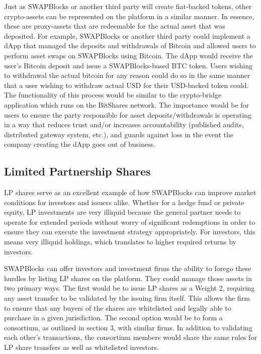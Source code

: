 \documentclass[12pt]{article}
\begin{document}
Just as SWAPBlocks or another third party will create fiat-backed tokens, other crypto-assets can be 
represented on the platform in a similar manner. In essence, these are proxy-assets that are redeemable 
for the actual asset that was deposited. For example, SWAPBlocks or another third party could implement a 
dApp that managed the deposits and withdrawals of Bitcoin and allowed users to perform asset swaps on SWAPBlocks 
using Bitcoin. The dApp would receive the user’s Bitcoin deposit and issue a SWAPBlocks-based BTC token. Users 
wishing to withdrawal the actual bitcoin for any reason could do so in the same manner that a user wishing to 
withdraw actual USD for their USD-backed token could. The functionality of this process would be similar to the 
crypto-bridge application which runs on the BitShares network. The importance would be for users to ensure the 
party responsible for asset deposits/withdrawals is operating in a way that reduces trust and/or increases 
accountability (published audits, distributed gateway system, etc.), and guards against loss in the event the 
company creating the dApp goes out of business.

\subsection{Limited Partnership Shares}

LP shares serve as an excellent example of how SWAPBlocks can improve market conditions for investors and 
issuers alike. Whether for a hedge fund or private equity, LP investments are very illiquid because the 
general partner needs to operate for extended periods without worry of significant redemptions in order to 
ensure they can execute the investment strategy appropriately. For investors, this means very illiquid holdings, 
which translates to higher required returns by investors.

SWAPBlocks can offer investors and investment firms the ability to forego these hurdles by listing LP shares on the 
platform. They could manage those assets in two primary ways. The first would be to issue LP shares as a Weight 2, 
requiring any asset transfer to be validated by the issuing firm itself. This allows the firm to ensure that any 
buyers of the shares are whitelisted and legally able to purchase in a given jurisdiction. The second option would 
be to form a consortium, as outlined in section 3, with similar firms. In addition to validating each other’s 
transactions, the consortium members would share the same rules for LP share transfers as well as whitelisted investors.
\end{document}
